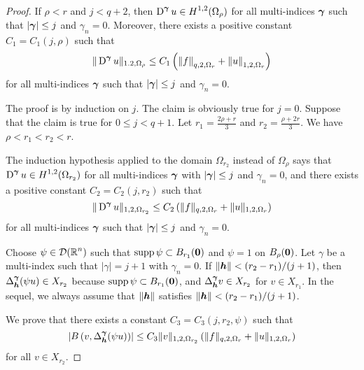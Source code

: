 \begin{proof}
 If $\rho<r$ and $j<q+2$, then
$\displaystyle \operatorname{D}^{{\bm{\gamma}}} u \in H^{1,2}(\Omega_{\rho})$ for all
multi-indices ${\bm{\gamma}}$ such that $|{\bm{\gamma}}|\leq j$ and
$\gamma_n =0$.
Moreover, there exists a positive constant $C_1 = C_1(j,\rho)$ such that
\begin{equation} \label{ell_reg_B1}
\|\operatorname{D}^{{\bm{\gamma}}} u\|_{1.2,\Omega_\rho} \leq C_1
\left( \left\|f\right\|_{q,2,\Omega_r}
+ \left\|u\right\|_{1,2,\Omega_r} \right)
\end{equation}
for all multi-indices ${\bm{\gamma}}$ such that $|{\bm{\gamma}}| \leq j$
and $\gamma_n =0$.

The proof is by induction on $j$.  The claim is obviously true for
$j=0$.  Suppose that the claim is true for $0\leq j < q+1$.  Let
$\displaystyle r_1 = \frac{2\rho+r}{3}$ and
$\displaystyle r_2 = \frac{\rho+2r}{3}$.  We have $\rho <r_1<r_2< r$.

The induction hypothesis applied to the domain $\Omega_{r_2}$ instead
of $\Omega_\rho$ says that
$\displaystyle \operatorname{D}^{{\bm{\gamma}}} u \in H^{1,2}(\Omega_{r_2})$ for
all multi-indices ${\bm{\gamma}}$ with $|{\bm{\gamma}}|\leq j$ and
$\gamma_n = 0$, and
there exists a positive constant $C_2 = C_2(j,r_2)$ such that
\begin{equation} \label{ell_reg_B2}
\|\operatorname{D}^{{\bm{\gamma}}} u\|_{1,2,\Omega_{r_2}} \leq C_2 \left( \|f\|_{q,2,\Omega_r}
+ \|u\|_{1,2,\Omega_r} \right)
\end{equation}
for all multi-indices ${\bm{\gamma}}$ such that $|{\bm{\gamma}}|\leq j$
and $\gamma_n =0$.

Choose $\displaystyle \psi \in \mathcal{D}(\mathbb{R}^n)$ such that
$\operatorname{supp} \psi \subset B_{r_1}({\bm{0}})$ and $\psi = 1$ on $B_{\rho}({\bm{0}})$.
Let $\gamma$ be a multi-index such that $|\gamma|=j+1$ with $\gamma_n=0$.
If $\displaystyle \|{\bm{h}}\| < (r_2-r_1)/(j+1)$,
then $\displaystyle \Delta_{{\bm{h}}}^{{\bm{\gamma}}} (\psi u) \in X_{r_2}$ because
$\operatorname{supp} \psi \subset B_{r_1}({\bm{0}})$, and
$\displaystyle \Delta_{{\bm{h}}}^{{\bm{\gamma}}} v \in X_{r_2}$ for
$v \in X_{r_1}$.  In
the sequel, we always assume that $\|{\bm{h}}\|$ satisfies
$\displaystyle \|{\bm{h}}\| < (r_2-r_1)/(j+1)$.

 We prove that there exists a constant
$C_3= C_3(j,r_2,\psi)$ such that
\begin{equation} \label{ell_reg_B3}
\left| B\left(v,\Delta_{{\bm{h}}}^{{\bm{\gamma}}}(\psi u)\right) \right|
\leq C_3 \|v\|_{1,2,\Omega_{r_2}} \left( \|f\|_{q,2,\Omega_r} +
\|u\|_{1,2,\Omega_r} \right)
\end{equation}
for all $v \in X_{r_2}$.


\end{proof}
